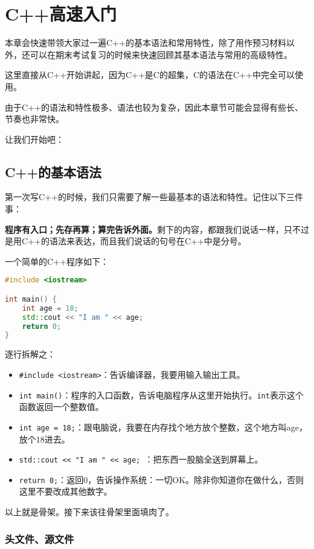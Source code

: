 \chapter{C++高速入门}

本章会快速带领大家过一遍C++的基本语法和常用特性，除了用作预习材料以外，还可以在期末考试复习的时候来快速回顾其基本语法与常用的高级特性。

这里直接从C++开始讲起，因为C++是C的超集，C的语法在C++中完全可以使用。

由于C++的语法和特性极多、语法也较为复杂，因此本章节可能会显得有些长、节奏也非常快。

让我们开始吧：

\section{C++的基本语法}

第一次写C++的时候，我们只需要了解一些最基本的语法和特性。记住以下三件事：

\textbf{程序有入口；先存再算；算完告诉外面。}剩下的内容，都跟我们说话一样，只不过是用C++的语法来表达，而且我们说话的句号在C++中是分号。

一个简单的C++程序如下：
\begin{lstlisting}[language=C++]
#include <iostream>

int main() {
    int age = 18;
    std::cout << "I am " << age;
    return 0;
}
\end{lstlisting}
逐行拆解之：
\begin{itemize}
  \item \texttt{\#include <iostream>}：告诉编译器，我要用输入输出工具。
  \item \texttt{int main()}：程序的入口函数，告诉电脑程序从这里开始执行。\texttt{int}表示这个函数返回一个整数值。
  \item \texttt{int age = 18;}：跟电脑说，我要在内存找个地方放个整数，这个地方叫age，放个18进去。
  \item \texttt{std::cout << "I am " << age; }：把东西一股脑全送到屏幕上。
  \item \texttt{return 0;}：返回0，告诉操作系统：一切OK。除非你知道你在做什么，否则这里不要改成其他数字。
\end{itemize}

以上就是骨架。接下来该往骨架里面填肉了。

\subsection{头文件、源文件}

